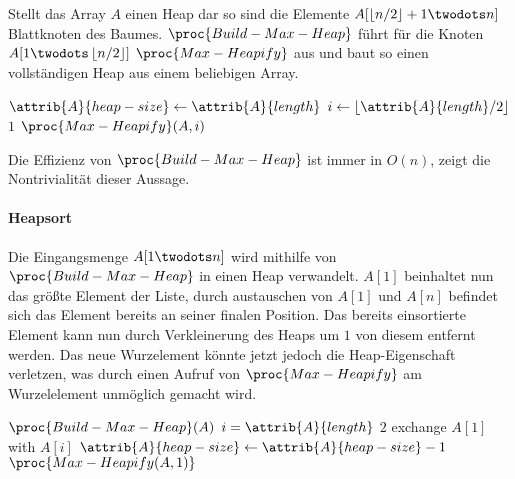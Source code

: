 Stellt das Array $A$ einen Heap dar so sind die Elemente $A[\floor{n / 2} + 1 \twodots n]$ Blattknoten des Baumes\footnotemark. $\proc{Build-Max-Heap}$ führt für die Knoten $A[1 \twodots \floor{n / 2}]$ $\proc{Max-Heapify}$ aus und baut so einen vollständigen Heap aus einem beliebigen Array.


\begin{codebox}
    \li $\attrib{A}{heap-size} \gets \attrib{A}{length}$
    \li \For $i \gets \lfloor \attrib{A}{length}/2 \rfloor$ \Downto $1$
    \li     \Do
                $\proc{Max-Heapify}(A, i)$
            \End
\end{codebox}

Die Effizienz von $\proc{Build-Max-Heap}$ ist immer in $O(n)$, \cite[155]{taocp3} zeigt die Nontrivialität dieser Aussage.

\paragraph{Heapsort}

Die Eingangsmenge $A[1 \twodots n]$ wird mithilfe von $\proc{Build-Max-Heap}$ in einen Heap verwandelt. $A[1]$ beinhaltet nun das größte Element der Liste, durch austauschen von $A[1]$ und $A[n]$ befindet sich das Element bereits an seiner finalen Position. Das bereits einsortierte Element kann nun durch Verkleinerung des Heaps um $1$ von diesem entfernt werden. Das neue Wurzelement könnte jetzt jedoch die Heap-Eigenschaft verletzen, was durch einen Aufruf von $\proc{Max-Heapify}$ am Wurzelelement unmöglich gemacht wird.

\begin{codebox}
    \li $\proc{Build-Max-Heap}(A)$
    \li \For $i = \attrib{A}{length}$ \Downto $2$
    \li     \Do
                exchange $A[1]$ with $A[i]$
    \li         $\attrib{A}{heap-size} \gets \attrib{A}{heap-size} - 1$
    \li         $\proc{Max-Heapify(A, 1)}$
            \End
\end{codebox}


